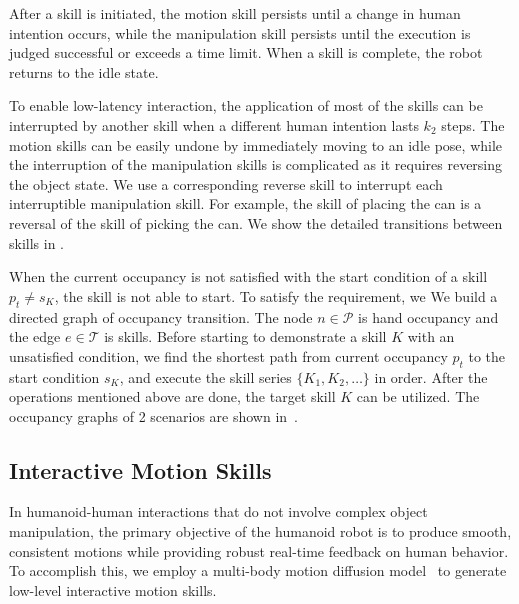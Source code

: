 After a skill is initiated, the motion skill persists until a change in human intention occurs, while the manipulation skill persists until the execution is judged successful or exceeds a time limit.
When a skill is complete, the robot returns to the idle state.

To enable low-latency interaction, the application of most of the skills can be interrupted by another skill when a different human intention lasts $k_2$ steps. 
The motion skills can be easily undone by immediately moving to an idle pose, while the interruption of the manipulation skills is complicated as it requires reversing the object state.
We use a corresponding reverse skill to interrupt each interruptible manipulation skill. For example, the skill of placing the can is a reversal of the skill of picking the can.
We show the detailed transitions between skills in .

When the current occupancy is not satisfied with the start condition of a skill $p_t \neq s_K$, the skill is not able to start.
To satisfy the requirement, we 
We build a directed graph of occupancy transition. The node $n\in \mathcal{P}$ is hand occupancy and the edge $e\in \mathcal{T}$ is skills. 
Before starting to demonstrate a skill $K$ with an unsatisfied condition, we find the shortest path from current occupancy $p_t$ to the start condition $s_K$, and execute the skill series $\{K_1, K_2, \ldots  \}$ in order.
After the operations mentioned above are done, the target skill $K$ can be utilized. The occupancy graphs of 2 scenarios are shown in~.

\subsection{Interactive Motion Skills}
\label{sec:inter-motion-skill}
In humanoid-human interactions that do not involve complex object manipulation, the primary objective of the humanoid robot is to produce smooth, consistent motions while providing robust real-time feedback on human behavior. 
To accomplish this, we employ a multi-body motion diffusion model~\citep{liang2024intergen} to generate low-level interactive motion skills. 

